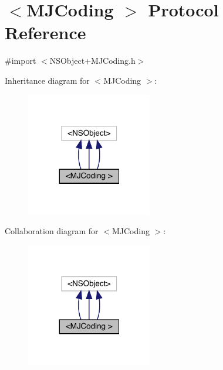 \hypertarget{protocol_m_j_coding_01-p}{}\section{$<$M\+J\+Coding $>$ Protocol Reference}
\label{protocol_m_j_coding_01-p}


{\ttfamily \#import $<$N\+S\+Object+\+M\+J\+Coding.\+h$>$}



Inheritance diagram for $<$M\+J\+Coding $>$\+:\nopagebreak
\begin{figure}[H]
\begin{center}
\leavevmode
\includegraphics[width=155pt]{protocol_m_j_coding_01-p__inherit__graph}
\end{center}
\end{figure}


Collaboration diagram for $<$M\+J\+Coding $>$\+:\nopagebreak
\begin{figure}[H]
\begin{center}
\leavevmode
\includegraphics[width=155pt]{protocol_m_j_coding_01-p__coll__graph}
\end{center}
\end{figure}
